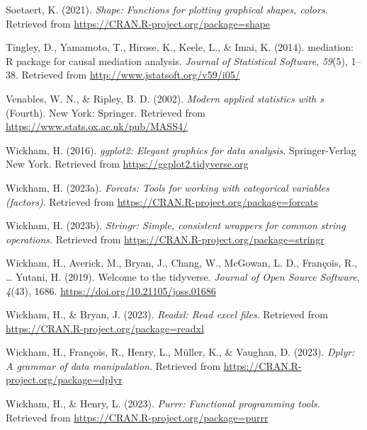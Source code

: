\documentclass[
  man,floatsintext]{apa6}
\newlength{\cslhangindent}
\newlength{\cslentryspacingunit} %
\newenvironment{CSLReferences}[2] %
 {%
  \setlength{\parindent}{0pt}
  \ifodd #1
  \let\oldpar\par
  \def\par{\hangindent=\cslhangindent\oldpar}
  \fi
  \setlength{\parskip}{#2\cslentryspacingunit}
 }%
 {}
\begin{document}
\begin{CSLReferences}{1}{0}
\leavevmode{}%
Soetaert, K. (2021). \emph{Shape: Functions for plotting graphical shapes, colors}. Retrieved from \url{https://CRAN.R-project.org/package=shape}

\leavevmode{}%
Tingley, D., Yamamoto, T., Hirose, K., Keele, L., \& Imai, K. (2014). {mediation}: {R} package for causal mediation analysis. \emph{Journal of Statistical Software}, \emph{59}(5), 1--38. Retrieved from \url{http://www.jstatsoft.org/v59/i05/}

\leavevmode{}%
Venables, W. N., \& Ripley, B. D. (2002). \emph{Modern applied statistics with s} (Fourth). New York: Springer. Retrieved from \url{https://www.stats.ox.ac.uk/pub/MASS4/}

\leavevmode{}%
Wickham, H. (2016). \emph{ggplot2: Elegant graphics for data analysis}. Springer-Verlag New York. Retrieved from \url{https://ggplot2.tidyverse.org}

\leavevmode{}%
Wickham, H. (2023a). \emph{Forcats: Tools for working with categorical variables (factors)}. Retrieved from \url{https://CRAN.R-project.org/package=forcats}

\leavevmode{}%
Wickham, H. (2023b). \emph{Stringr: Simple, consistent wrappers for common string operations}. Retrieved from \url{https://CRAN.R-project.org/package=stringr}

\leavevmode{}%
Wickham, H., Averick, M., Bryan, J., Chang, W., McGowan, L. D., François, R., \ldots{} Yutani, H. (2019). Welcome to the {tidyverse}. \emph{Journal of Open Source Software}, \emph{4}(43), 1686. \url{https://doi.org/10.21105/joss.01686}

\leavevmode{}%
Wickham, H., \& Bryan, J. (2023). \emph{Readxl: Read excel files}. Retrieved from \url{https://CRAN.R-project.org/package=readxl}

\leavevmode{}%
Wickham, H., François, R., Henry, L., Müller, K., \& Vaughan, D. (2023). \emph{Dplyr: A grammar of data manipulation}. Retrieved from \url{https://CRAN.R-project.org/package=dplyr}

\leavevmode{}%
Wickham, H., \& Henry, L. (2023). \emph{Purrr: Functional programming tools}. Retrieved from \url{https://CRAN.R-project.org/package=purrr}


\end{CSLReferences}
\end{document}
